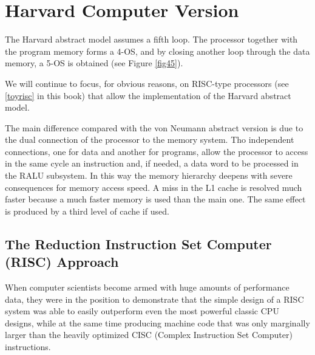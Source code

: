 \section{Harvard Computer Version}

The Harvard abstract model assumes a fifth loop. The processor together with the program memory forms a 4-OS, and by closing another loop through the data memory, a 5-OS is obtained (see Figure \ref{fig45}).



We will continue to focus, for obvious reasons, on RISC-type processors (see \ref{toyrisc} in this book) that allow the implementation of the Harvard abstract model.


The main difference compared with the von Neumann abstract version is due to the dual connection of the processor to the memory system. Tho independent connections, one for data and another for programs, allow the processor to access in the same cycle an instruction and, if needed, a data word to be processed in the RALU subsystem. In this way the memory hierarchy deepens with severe consequences for memory access speed. A miss in the L1 cache is resolved much faster because a much faster memory is used than the main one. The same effect is produced by a third level of cache if used.

\subsection{The Reduction Instruction Set Computer (RISC) Approach}

When computer scientists become armed with huge amounts of performance data, they were in the position to demonstrate that the simple design of a RISC system was able to easily outperform even the most powerful classic CPU designs, while at the same time producing machine code that was only marginally larger than the heavily optimized CISC (Complex Instruction Set Computer) instructions.

